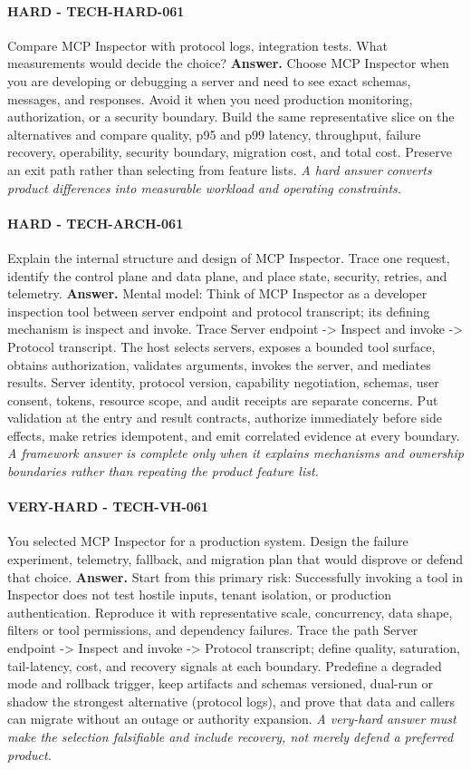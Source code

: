 \paragraph{HARD - TECH-HARD-061} Compare MCP Inspector with protocol logs, integration tests. What measurements would decide the choice?
\textbf{Answer.} Choose MCP Inspector when you are developing or debugging a server and need to see exact schemas, messages, and responses. Avoid it when you need production monitoring, authorization, or a security boundary. Build the same representative slice on the alternatives and compare quality, p95 and p99 latency, throughput, failure recovery, operability, security boundary, migration cost, and total cost. Preserve an exit path rather than selecting from feature lists.
\textit{A hard answer converts product differences into measurable workload and operating constraints.}
\paragraph{HARD - TECH-ARCH-061} Explain the internal structure and design of MCP Inspector. Trace one request, identify the control plane and data plane, and place state, security, retries, and telemetry.
\textbf{Answer.} Mental model: Think of MCP Inspector as a developer inspection tool between server endpoint and protocol transcript; its defining mechanism is inspect and invoke. Trace Server endpoint -> Inspect and invoke -> Protocol transcript. The host selects servers, exposes a bounded tool surface, obtains authorization, validates arguments, invokes the server, and mediates results. Server identity, protocol version, capability negotiation, schemas, user consent, tokens, resource scope, and audit receipts are separate concerns. Put validation at the entry and result contracts, authorize immediately before side effects, make retries idempotent, and emit correlated evidence at every boundary.
\textit{A framework answer is complete only when it explains mechanisms and ownership boundaries rather than repeating the product feature list.}
\paragraph{VERY-HARD - TECH-VH-061} You selected MCP Inspector for a production system. Design the failure experiment, telemetry, fallback, and migration plan that would disprove or defend that choice.
\textbf{Answer.} Start from this primary risk: Successfully invoking a tool in Inspector does not test hostile inputs, tenant isolation, or production authentication. Reproduce it with representative scale, concurrency, data shape, filters or tool permissions, and dependency failures. Trace the path Server endpoint -> Inspect and invoke -> Protocol transcript; define quality, saturation, tail-latency, cost, and recovery signals at each boundary. Predefine a degraded mode and rollback trigger, keep artifacts and schemas versioned, dual-run or shadow the strongest alternative (protocol logs), and prove that data and callers can migrate without an outage or authority expansion.
\textit{A very-hard answer must make the selection falsifiable and include recovery, not merely defend a preferred product.}
